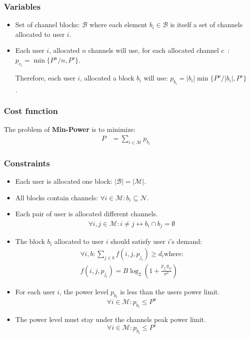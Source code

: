 \documentclass[a4paper, 10pt]{article}
\begin{document}
\subsubsection*{Variables}
\begin{itemize}
    \item Set of channel blocks: $\mathcal{B}$ where each element $b_i \in
    \mathcal{B}$ is itself a set of channels allocated to user $i$.
    \item Each user $i$, allocated $n$ channels will use, for each
          allocated channel $c$~: $p_{c_i} = \min\{ P^u / n, P^s\}$.
          
          Therefore, each user $i$, allocated a block $b_i$ will use:
          $p_{b_i} = |b_i| \min\{ P^u / |b_i|, P^s\}$.
\end{itemize}

\subsubsection*{Cost function}
The problem of \textbf{Min-Power} is to minimize:
\begin{align*}
     P &= \sum\limits_{i \in \mathcal{M}} p_{b_i}
 \end{align*}

\subsubsection*{Constraints}
\begin{itemize}
    \item Each user is allocated one block: $|\mathcal{B}| = |\mathcal{M}|$.
    \item All blocks contain channels: $\forall i \in \mathcal{M}: b_i \subseteq \mathcal{N}$.
    \item Each pair of user is allocated different channels.
    \begin{align*}
    \forall i,j \in \mathcal{M}: i \neq j \leftrightarrow b_i \cap b_j = \emptyset
    \end{align*}
    \item The block $b_i$ allocated to user $i$ should satisfy user $i$'s
    demand:
    \begin{align*}
        \forall i, b : \sum\limits_{j \in b}
        f(i, j, p_{j_i}) \geq d_i \text{where:}\\
        f(i, j, p_{j_i}) = B \log_2(1 + \frac{p_{j_i}g_{ij}}{\sigma^2})  
    \end{align*}
    \item For each user $i$, the power level $p_{b_i}$ is less than the users power limit. 
    \begin{equation*} 
        \forall i \in \mathcal{M} : p_{b_i} \leq P^u
    \end{equation*}
    \item The power level must stay under the channels peak power limit.
    \begin{equation*}
    \forall i \in \mathcal{M} : p_{b_i} \leq P^s
    \end{equation*}
\end{itemize}
\end{document}
